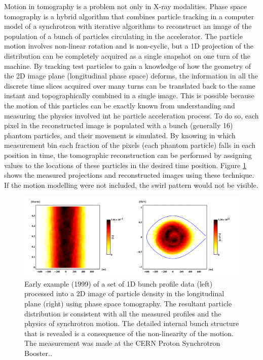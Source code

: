 Motion in tomography is a problem not only in X-ray modalities. Phase space tomography is a hybrid algorithm that combines particle tracking in a computer model of a synchrotron with iterative algorithms to reconstruct an image of the population of a bunch of particles circulating in the accelerator. The particle motion involves non-linear rotation and is non-cyclic, but a 1D projection of the distribution can be completely acquired as a single snapshot on one turn of the machine. By tracking test particles to gain a knowledge of how the geometry of the 2D image plane (longitudinal phase space) deforms, the information in all the discrete time slices acquired over many turns can be translated back to the same instant and topographically combined in a single image. This is possible because the motion of this particles can be exactly known from understanding and measuring the physics involved int he particle acceleration process. To do so, each pixel in the reconstructed image is populated with a bunch (generally 16) phantom particles, and their movement is simulated. By knowing in which measurement bin each fraction of the pixels (each phantom particle) falls in each position in time, the tomographic reconstruction can be performed by assigning values to the locations of these particles in the desired time position. Figure \ref{fig:PST} shows the measured projections and reconstructed images using these technique. If the motion modelling were not included, the swirl pattern would not be visible.

\begin{figure}

\begin{center} 

\includegraphics[width=\linewidth]{StateOfArt/Tosca2016fig.png} 

\caption[Phase space tomography]{\label{fig:PST} Early example (1999) of a set of 1D bunch profile data (left) processed into a 2D image of particle density in the longitudinal plane (right) using phase space tomography.  The resultant particle distribution is consistent with all the measured profiles and the physics of synchrotron motion.  The detailed internal bunch structure that is revealed is a consequence of the non-linearity of the motion.  The measurement was made at the CERN Proton Synchrotron Booster.\cite{pstweb}.} 
\end{center} 
\end{figure}


